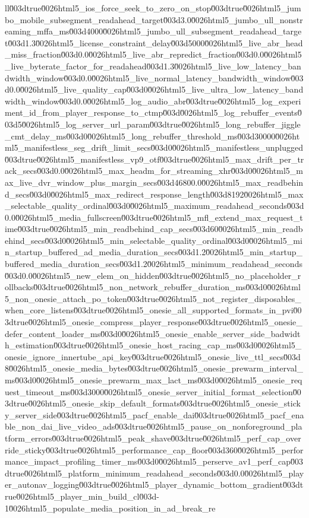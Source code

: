 {ll\u003dtrue\u0026html5_ios_force_seek_to_zero_on_stop\u003dtrue\u0026html5_jumbo_mobile_subsegment_readahead_target\u003d3.0\u0026html5_jumbo_ull_nonstreaming_mffa_ms\u003d4000\u0026html5_jumbo_ull_subsegment_readahead_target\u003d1.3\u0026html5_license_constraint_delay\u003d5000\u0026html5_live_abr_head_miss_fraction\u003d0.0\u0026html5_live_abr_repredict_fraction\u003d0.0\u0026html5_live_byterate_factor_for_readahead\u003d1.3\u0026html5_live_low_latency_bandwidth_window\u003d0.0\u0026html5_live_normal_latency_bandwidth_window\u003d0.0\u0026html5_live_quality_cap\u003d0\u0026html5_live_ultra_low_latency_bandwidth_window\u003d0.0\u0026html5_log_audio_abr\u003dtrue\u0026html5_log_experiment_id_from_player_response_to_ctmp\u003d\u0026html5_log_rebuffer_events\u003d5\u0026html5_log_server_url_param\u003dtrue\u0026html5_long_rebuffer_jiggle_cmt_delay_ms\u003d0\u0026html5_long_rebuffer_threshold_ms\u003d30000\u0026html5_manifestless_seg_drift_limit_secs\u003d0\u0026html5_manifestless_unplugged\u003dtrue\u0026html5_manifestless_vp9_otf\u003dtrue\u0026html5_max_drift_per_track_secs\u003d0.0\u0026html5_max_headm_for_streaming_xhr\u003d0\u0026html5_max_live_dvr_window_plus_margin_secs\u003d46800.0\u0026html5_max_readbehind_secs\u003d0\u0026html5_max_redirect_response_length\u003d8192\u0026html5_max_selectable_quality_ordinal\u003d0\u0026html5_maximum_readahead_seconds\u003d0.0\u0026html5_media_fullscreen\u003dtrue\u0026html5_mfl_extend_max_request_time\u003dtrue\u0026html5_min_readbehind_cap_secs\u003d60\u0026html5_min_readbehind_secs\u003d0\u0026html5_min_selectable_quality_ordinal\u003d0\u0026html5_min_startup_buffered_ad_media_duration_secs\u003d1.2\u0026html5_min_startup_buffered_media_duration_secs\u003d1.2\u0026html5_minimum_readahead_seconds\u003d0.0\u0026html5_new_elem_on_hidden\u003dtrue\u0026html5_no_placeholder_rollbacks\u003dtrue\u0026html5_non_network_rebuffer_duration_ms\u003d0\u0026html5_non_onesie_attach_po_token\u003dtrue\u0026html5_not_register_disposables_when_core_listens\u003dtrue\u0026html5_onesie_all_supported_formats_in_pvi\u003dtrue\u0026html5_onesie_compress_player_response\u003dtrue\u0026html5_onesie_defer_content_loader_ms\u003d0\u0026html5_onesie_enable_server_side_badwidth_estimation\u003dtrue\u0026html5_onesie_host_racing_cap_ms\u003d0\u0026html5_onesie_ignore_innertube_api_key\u003dtrue\u0026html5_onesie_live_ttl_secs\u003d8\u0026html5_onesie_media_bytes\u003dtrue\u0026html5_onesie_prewarm_interval_ms\u003d0\u0026html5_onesie_prewarm_max_lact_ms\u003d0\u0026html5_onesie_request_timeout_ms\u003d3000\u0026html5_onesie_server_initial_format_selection\u003dtrue\u0026html5_onesie_skip_default_formats\u003dtrue\u0026html5_onesie_sticky_server_side\u003dtrue\u0026html5_pacf_enable_dai\u003dtrue\u0026html5_pacf_enable_non_dai_live_video_ads\u003dtrue\u0026html5_pause_on_nonforeground_platform_errors\u003dtrue\u0026html5_peak_shave\u003dtrue\u0026html5_perf_cap_override_sticky\u003dtrue\u0026html5_performance_cap_floor\u003d360\u0026html5_performance_impact_profiling_timer_ms\u003d0\u0026html5_perserve_av1_perf_cap\u003dtrue\u0026html5_platform_minimum_readahead_seconds\u003d0.0\u0026html5_player_autonav_logging\u003dtrue\u0026html5_player_dynamic_bottom_gradient\u003dtrue\u0026html5_player_min_build_cl\u003d-1\u0026html5_populate_media_position_in_ad_break_re}
